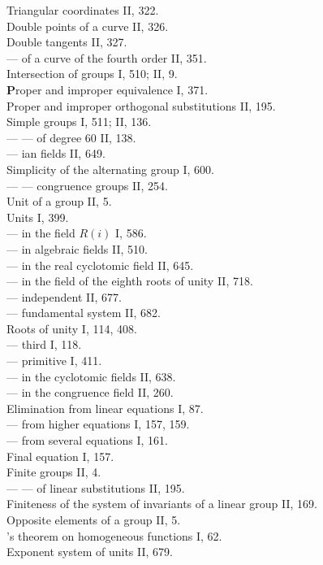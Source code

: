 Triangular coordinates II, 322.\\
Double points of a curve II, 326.\\
Double tangents II, 327.\\
--- of a curve of the fourth order II, 351.\\
Intersection of groups I, 510; II, 9.\\

\medskip
\noindent
\textbf{P}roper and improper equivalence I, 371.\\
Proper and improper orthogonal substitutions II, 195.\\
Simple groups I, 511; II, 136.\\
--- --- of degree 60 II, 138.\\
--- ian fields II, 649.\\
Simplicity of the alternating group I, 600.\\
--- --- congruence groups II, 254.\\
Unit of a group II, 5.\\
Units I, 399.\\
--- in the field $R(i)$ I, 586.\\
--- in algebraic fields II, 510.\\
--- in the real cyclotomic field II, 645.\\
--- in the field of the eighth roots of unity II, 718.\\
--- independent II, 677.\\
--- fundamental system II, 682.\\
Roots of unity I, 114, 408.\\
--- third I, 118.\\
--- primitive I, 411.\\
--- in the cyclotomic fields II, 638.\\
--- in the congruence field II, 260.\\
Elimination from linear equations I, 87.\\
--- from higher equations I, 157, 159.\\
--- from several equations I, 161.\\
Final equation I, 157.\\
Finite groups II, 4.\\
--- --- of linear substitutions II, 195.\\
Finiteness of the system of invariants of a linear group II, 169.\\
Opposite elements of a group II, 5.\\
's theorem on homogeneous functions I, 62.\\
Exponent system of units II, 679.\\

